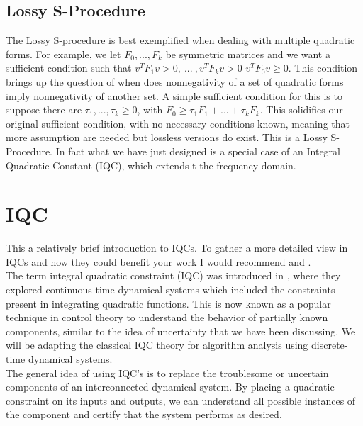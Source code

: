 \documentclass{article}[12pt]
\begin{document}
\subsection{Lossy S-Procedure}
The Lossy S-procedure is best exemplified when dealing with multiple quadratic forms. For example, we let $F_0,...,F_k$ be symmetric matrices and we want a sufficient condition such that  $v^T F_1 v > 0, \: ... \: , v^T F_k v > 0 $ \Rightarrow $v^T F_0 v \geq 0$. This condition brings up the question of when does nonnegativity of a set of quadratic forms imply nonnegativity of another set. A simple sufficient condition for this is to suppose there are $\tau_1, ..., \tau_k \geq 0$, with $F_0 \geq \tau_1 F_1+...+\tau_k F_k$.  This solidifies our original sufficient condition, with no necessary conditions known, meaning that more assumption are needed but lossless versions do exist. This is a Lossy S-Procedure. In fact what we have just designed is a special case of an Integral Quadratic Constant (IQC), which extends t the frequency domain.  


\section{IQC}
This a relatively brief introduction to IQCs. To gather a more detailed view in IQCs and how they could benefit your work I would recommend \cite{lessard2014analysis} and \cite{MegRant97}.
\\

\noindent The term integral quadratic constraint (IQC) was introduced in \cite{MegRant97}, where they explored continuous-time dynamical systems which included the constraints present in integrating quadratic functions. This is now known as a popular technique in control theory to understand the behavior of partially known components, similar to the idea of uncertainty that we have been discussing. We will be adapting the classical IQC theory for algorithm analysis using discrete-time dynamical systems. 
\\

\noindent The general idea of using IQC's is to replace the troublesome or uncertain components of an interconnected dynamical system. By placing a quadratic constraint on its inputs and outputs, we can understand all possible instances of the component and certify that the system performs as desired.
\\
\end{document}
